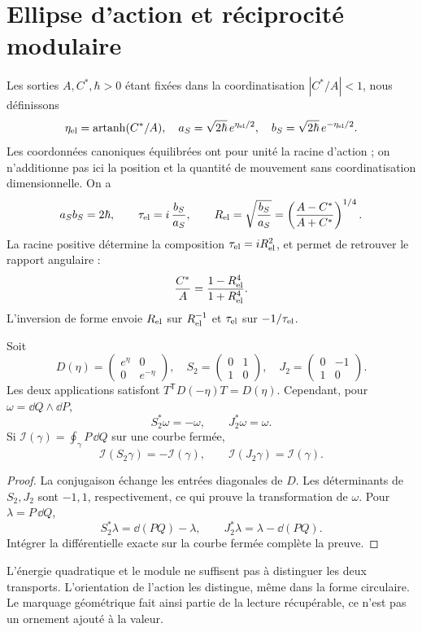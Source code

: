 \section{Ellipse d’action et réciprocité modulaire}
\label{sec:ellipse}
Les sorties $A,C^*,\hbar>0$ étant fixées dans la coordinatisation
$|C^*/A|<1$, nous définissons
\[
\eta_{\rm el}=\operatorname{artanh}(C^*/A),\quad
a_S=\sqrt{2\hbar}\,e^{\eta_{\rm el}/2},\quad
b_S=\sqrt{2\hbar}\,e^{-\eta_{\rm el}/2}.
\]
Les coordonnées canoniques équilibrées ont pour unité la racine d’action ;
on n’additionne pas ici la position et la quantité de mouvement sans coordinatisation dimensionnelle.
On a
\[
a_Sb_S=2\hbar,\qquad
\tau_{\rm el}=i\,\frac{b_S}{a_S},\qquad
R_{\rm el}=\sqrt{\frac{b_S}{a_S}}
=\left(\frac{A-C^*}{A+C^*}\right)^{1/4}.
\]
La racine positive détermine la composition $\tau_{\rm el}=iR_{\rm el}^2$,
et permet de retrouver le rapport angulaire :
\[
\frac{C^*}{A}=\frac{1-R_{\rm el}^4}{1+R_{\rm el}^4}.
\]
L’inversion de forme envoie $R_{\rm el}$ sur $R_{\rm el}^{-1}$ et
$\tau_{\rm el}$ sur $-1/\tau_{\rm el}$.

\begin{proposition}
Soit
\[
D(\eta)=\begin{pmatrix}e^\eta&0\\0&e^{-\eta}\end{pmatrix},
\quad
S_2=\begin{pmatrix}0&1\\1&0\end{pmatrix},
\quad
J_2=\begin{pmatrix}0&-1\\1&0\end{pmatrix}.
\]
Les deux applications satisfont $T^{\mathsf T}D(-\eta)T=D(\eta)$.
Cependant, pour $\omega=\dd Q\wedge\dd P$,
\[
S_2^*\omega=-\omega,\qquad J_2^*\omega=\omega.
\]
Si $\mathcal I(\gamma)=\oint_\gamma P\,\dd Q$ sur une courbe fermée,
\[
\mathcal I(S_2\gamma)=-\mathcal I(\gamma),\qquad
\mathcal I(J_2\gamma)=\mathcal I(\gamma).
\]
\end{proposition}
\begin{proof}
La conjugaison échange les entrées diagonales de $D$.
Les déterminants de $S_2,J_2$ sont $-1,1$, respectivement, ce qui
prouve la transformation de $\omega$. Pour $\lambda=P\,\dd Q$,
\[
S_2^*\lambda=\dd(PQ)-\lambda,\qquad
J_2^*\lambda=\lambda-\dd(PQ).
\]
Intégrer la différentielle exacte sur la courbe fermée complète la preuve.
\end{proof}

L’énergie quadratique et le module ne suffisent pas à distinguer les deux
transports. L’orientation de l’action les distingue, même
dans la forme circulaire. Le marquage géométrique fait ainsi partie de la lecture
récupérable, ce n’est pas un ornement ajouté à la valeur.
